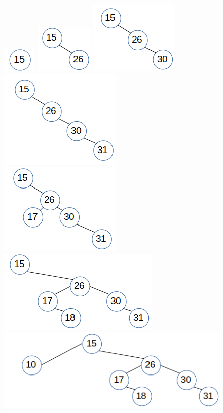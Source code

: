 \documentclass{article}
\begin{document}
\begin{enumerate}
\begin{figure}[H]
	\includegraphics[]{P10/0-15}
	\includegraphics[]{P10/1-26}
	\includegraphics[]{P10/2-30}
	\includegraphics[]{P10/3-31}
	\includegraphics[]{P10/4-17}
	\includegraphics[]{P10/5-18}
	\includegraphics[]{P10/6-10}

\end{figure}
\end{enumerate}
\end{document}

